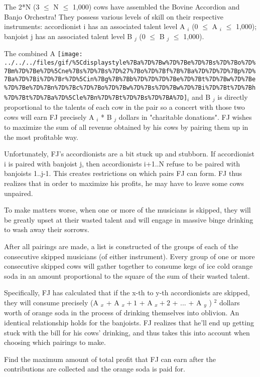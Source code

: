 The 2*N (3  $\le$  N  $\le$  1,000) cows have assembled the Bovine Accordion and Banjo Orchestra!  They possess various levels of skill on their respective instruments: accordionist i has an associated talent level A   $_    i   $   (0  $\le$  A   $_    i   $    $\le$  1,000); banjoist j has an associated talent level B   $_    j   $   (0  $\le$  B   $_    j   $    $\le$  1,000).  

   The combined A   
\texttt{[image: ../../../files/gif/\%5Cdisplaystyle\%7Ba\%7D\%7Bw\%7D\%7Be\%7D\%7Bs\%7D\%7Bo\%7D\%7Bm\%7D\%7Be\%7D\%5Cne\%7Bs\%7D\%7Bs\%7D\%27\%7Bo\%7D\%7Bf\%7B\%7Ba\%7D\%7D\%7D\%7Bp\%7D\%7Ba\%7D\%7Bi\%7D\%7Br\%7D\%5Cin\%7Bg\%7B\%7Bb\%7D\%7D\%7D\%7Be\%7D\%7Bt\%7D\%7Bw\%7D\%7Be\%7D\%7Be\%7D\%7Bn\%7D\%7Bc\%7D\%7Bo\%7D\%7Bw\%7D\%7Bs\%7D\%7Bw\%7D\%7Bi\%7D\%7Bt\%7D\%7Bh\%7D\%7Bt\%7D\%7Ba\%7D\%5Cle\%7Bn\%7D\%7Bt\%7D\%7Bs\%7D\%7BA\%7D]}$_    i   $   and B   $_    j   $   is directly proportional to the talents of each cow in the pair so a concert with those two cows will earn FJ precisely A   $_    i   $   * B   $_    j   $   dollars in "charitable donations".  FJ wishes to maximize the sum of all revenue obtained by his cows by pairing them up in the most profitable way.  

   Unfortunately, FJ's accordionists are a bit stuck up and stubborn. If accordionist i is paired with banjoist j, then accordionists i+1..N refuse to be paired with banjoists 1..j-1. This creates restrictions on which pairs FJ can form. FJ thus realizes that in order to maximize his profits, he may have to leave some cows unpaired.  

   To make matters worse, when one or more of the musicians is skipped, they will be greatly upset at their wasted talent and will engage in massive binge drinking to wash away their sorrows.  

   After all pairings are made, a list is constructed of the groups of each of the consecutive skipped musicians (of either instrument). Every group of one or more consecutive skipped cows will gather together to consume kegs of ice cold orange soda in an amount proportional to the square of the sum of their wasted talent.  

   Specifically, FJ has calculated that if the x-th to y-th accordionists are skipped, they will consume precisely (A   $_    x   $   + A   $_    x+1   $   + A   $_    x+2   $   + ... + A   $_    y   $   )   $^    2   $   dollars worth of orange soda in the process of drinking themselves into oblivion. An identical relationship holds for the banjoists. FJ realizes that he'll end up getting stuck with the bill for his cows' drinking, and thus takes this into account when choosing which pairings to make.  

   Find the maximum amount of total profit that FJ can earn after the contributions are collected and the orange soda is paid for.